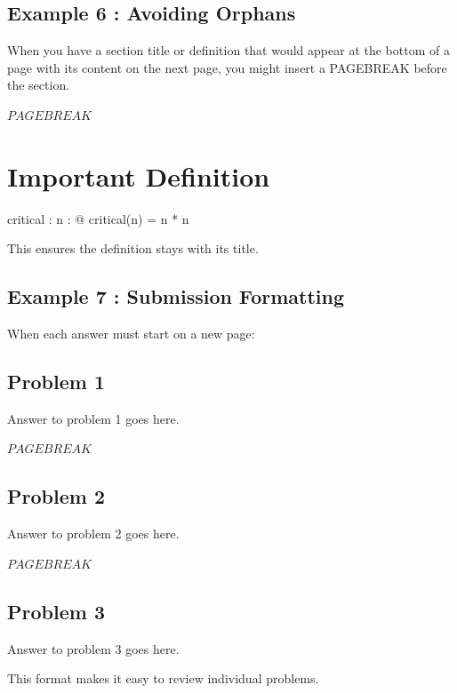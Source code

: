 \documentclass[a4paper,10pt,fleqn]{article}
\begin{document}
\bigskip

\subsection*{Example 6 : Avoiding Orphans}

\noindent When you have a section title or definition that would appear at the bottom of a page with its content on the next page, you might insert a PAGEBREAK before the section.

\bigskip

\noindent
$PAGEBREAK$


\section*{Important Definition}

\begin{axdef}
critical : \nat \fun \nat
\where
\forall n : \nat @ critical(n) = n * n
\end{axdef}

\noindent This ensures the definition stays with its title.

\bigskip

\subsection*{Example 7 : Submission Formatting}

\noindent When each answer must start on a new page:

\bigskip

\subsection*{Problem 1}

\noindent Answer to problem 1 goes here.

\bigskip

\noindent
$PAGEBREAK$


\subsection*{Problem 2}

\noindent Answer to problem 2 goes here.

\bigskip

\noindent
$PAGEBREAK$


\subsection*{Problem 3}

\noindent Answer to problem 3 goes here.

\bigskip

\noindent This format makes it easy to review individual problems.

\bigskip
\end{document}
